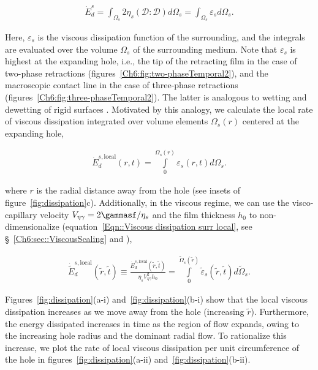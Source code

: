\begin{align}
	\dot{E}_d^s = \int_{\Omega_s} 2\eta_{s} \left(\boldsymbol{\mathcal{D}}:\boldsymbol{\mathcal{D}}\right) d\Omega_s = \int_{\Omega_s}\varepsilon_s d\Omega_s.
	\label{Eqn::Viscous dissipation surr}
\end{align}

\noindent Here, $\varepsilon_s$ is the viscous dissipation function of the surrounding, and the integrals are evaluated over the volume $\Omega_{s}$ of the surrounding medium. Note that $\varepsilon_s$ is highest at the expanding hole, i.e., the tip of the retracting film in the case of two-phase retractions (figures~\ref{Ch6:fig:two-phaseTemporal2}), and the macroscopic contact line in the case of three-phase retractions (figures~\ref{Ch6:fig:three-phaseTemporal2}). The latter is analogous to wetting and dewetting of rigid surfaces \citep{degennes-1985-rmp, bonn2009wetting, snoeijer-2013-arfm}. Motivated by this analogy, we calculate the local rate of viscous dissipation integrated over volume elements $\Omega_s(r)$ centered at the expanding hole,

\begin{align}
	\dot{E}_d^{s, \text{local}}(r, t) = \int\limits_{0}^{\Omega_s(r)} \varepsilon_s(r, t) d\Omega_s.
	\label{Eqn::Viscous dissipation surr local}
\end{align}

\noindent where $r$ is the radial distance away from the hole (see insets of figure~\ref{fig:dissipation}c). Additionally, in the viscous regime, we can use the visco-capillary velocity $V_{\eta\gamma} = 2\gammasf/\eta_s$ and the film thickness $h_0$ to non-dimensionalize (equation~\eqref{Eqn::Viscous dissipation surr local}, see \S~\ref{Ch6:sec::ViscousScaling} and \citep{stone1989relaxation}), 

\begin{align}
	\dot{\tilde{E}}_d^{s, \text{local}}\left(\tilde{r}, \tilde{t}\right) \equiv \frac{\dot{E}_d^{s, \text{local}}\left(\tilde{r}, \tilde{t}\right)}{\eta_sV_{\eta\gamma}^2h_0} = \int\limits_{0}^{\tilde{\Omega}_s(\tilde{r})} \tilde{\varepsilon}_s\left(\tilde{r}, \tilde{t}\right) d\tilde{\Omega}_s.
	\label{Eqn::Viscous dissipation surr dimless}
\end{align}

Figures~\ref{fig:dissipation}(a-i) and~\ref{fig:dissipation}(b-i) show that the local viscous dissipation increases as we move away from the hole (increasing $\tilde{r}$). Furthermore, the energy dissipated increases in time as the region of flow expands, owing to the increasing hole radius and the dominant radial flow. To rationalize this increase, we plot the rate of local viscous dissipation per unit circumference of the hole in figures~\ref{fig:dissipation}(a-ii) and~\ref{fig:dissipation}(b-ii).

